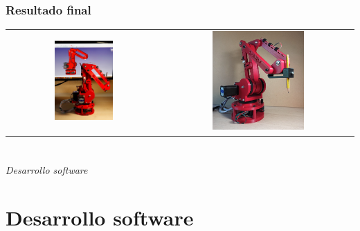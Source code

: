 \documentclass{beamer}
\begin{document}
\begin{frame}
  \frametitle{Resultado final}
  \begin{table}[htbp]
  \begin{tabular}{cc}
    \includegraphics[width=0.4\textwidth, valign=m]{figs/resultado2.jpg} & \includegraphics[width=0.5\textwidth, valign=m]{figs/resultado1.jpg} 
  \end{tabular}
\end{table}
\end{frame}


\section*{}
\begin{frame}{}
  \centering \Huge
  \emph{Desarrollo software}
\end{frame}
\section{Desarrollo software}
\end{document}
